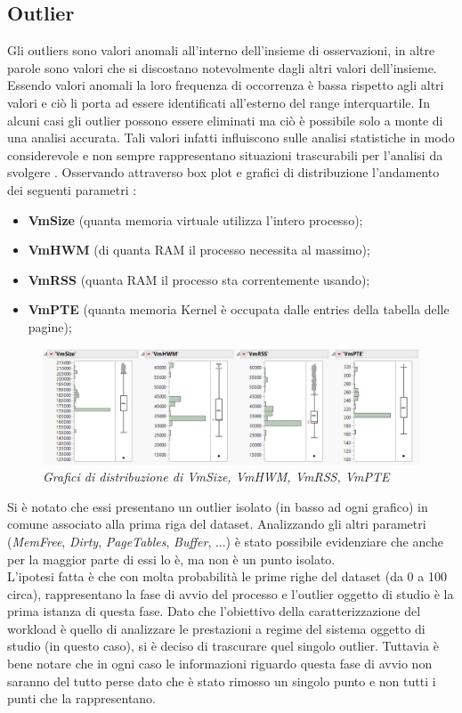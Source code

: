 \subsection{Outlier}
Gli outliers sono valori anomali all'interno dell'insieme di osservazioni, in altre parole sono valori che si discostano notevolmente dagli altri valori dell'insieme. 
Essendo valori anomali la loro frequenza di occorrenza è bassa rispetto agli altri valori e ciò li porta ad essere identificati all'esterno del range interquartile. 
In alcuni casi gli outlier possono essere eliminati ma ciò è possibile solo a monte di una analisi accurata. Tali valori infatti influiscono sulle analisi statistiche in modo considerevole e non sempre rappresentano situazioni trascurabili per l'analisi da svolgere .
Osservando attraverso box plot e grafici di distribuzione l'andamento dei seguenti parametri :
\begin{itemize}
	\item \textbf{VmSize} (quanta memoria virtuale utilizza l'intero processo);
	\item \textbf{VmHWM} (di quanta RAM il processo necessita al massimo);
	\item \textbf{VmRSS} (quanta RAM il processo sta correntemente usando);
	\item \textbf{VmPTE} (quanta memoria Kernel è occupata dalle entries della tabella delle pagine);
\end{itemize}
\begin{figure}[H]
	\centering
	\includegraphics[width=1\textwidth]{img/hw1/outlier_vm.png}
	\caption{\textit{Grafici di distribuzione di VmSize, VmHWM, VmRSS, VmPTE}}
\end{figure}
Si è notato che essi presentano un outlier isolato (in basso ad ogni grafico) in comune associato alla prima riga del dataset. Analizzando gli altri parametri (\textit{MemFree}, \textit{Dirty}, \textit{PageTables}, \textit{Buffer}, ...) è stato possibile evidenziare che anche per la maggior parte di essi lo è, ma non è un punto isolato. 
\\L'ipotesi fatta è che con molta probabilità le prime righe del dataset (da 0 a 100 circa), rappresentano la fase di avvio del processo e l'outlier oggetto di studio è la prima istanza di questa fase. Dato che l'obiettivo della caratterizzazione del workload è quello di analizzare le prestazioni a regime del sistema oggetto di studio (in questo caso), si è deciso di trascurare quel singolo outlier. Tuttavia è bene notare che in ogni caso le informazioni riguardo questa fase di avvio non saranno del tutto perse dato che è stato rimosso un singolo punto e non tutti i punti che la rappresentano.
